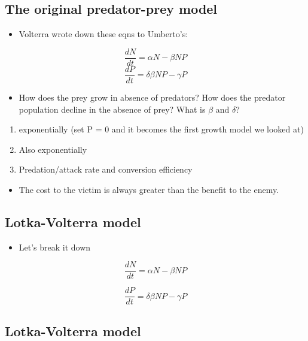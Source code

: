 \documentclass[
  letterpaper,
  DIV=11,
  numbers=noendperiod]{scrartcl}
\providecommand{\tightlist}{%
  \setlength{\itemsep}{0pt}\setlength{\parskip}{0pt}}\usepackage{longtable,booktabs,array}
\begin{document}
\hypertarget{the-original-predator-prey-model-4}{%
\subsection{The original predator-prey
model}\label{the-original-predator-prey-model-4}}

\begin{itemize}
\tightlist
\item
  Volterra wrote down these eqns to Umberto's:
\end{itemize}

\[\frac{dN}{dt}=\alpha N - \beta NP\]
\[\frac{dP}{dt}=\delta \beta NP-\gamma P\]

\begin{itemize}
\tightlist
\item
  How does the prey grow in absence of predators? How does the predator
  population decline in the absence of prey? What is \(\beta\) and
  \(\delta\)?
\end{itemize}

\begin{enumerate}
\def\labelenumi{\arabic{enumi})}
\tightlist
\item
  exponentially (set P = 0 and it becomes the first growth model we
  looked at)
\item
  Also exponentially
\item
  Predation/attack rate and conversion efficiency
\end{enumerate}

\begin{itemize}
\tightlist
\item
  The cost to the victim is always greater than the benefit to the
  enemy.
\end{itemize}

\hypertarget{lotka-volterra-model}{%
\subsection{Lotka-Volterra model}\label{lotka-volterra-model}}

\begin{itemize}
\tightlist
\item
  Let's break it down
\end{itemize}

\[\frac{dN}{dt}=\alpha N - \beta NP\]

\[\frac{dP}{dt}=\delta \beta NP-\gamma P\]

\hypertarget{lotka-volterra-model-1}{%
\subsection{Lotka-Volterra model}\label{lotka-volterra-model-1}}
\end{document}

